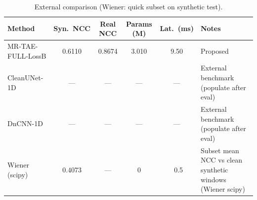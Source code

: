 \begin{table}[t]
\centering
\caption{External comparison (Wiener: quick subset on synthetic test).}
\label{tab:comparison}
\begin{tabular}{lccccl}
\hline
Method & Syn.\ NCC & Real NCC & Params (M) & Lat.\ (ms) & Notes \\
\hline
MR-TAE-FULL-LossB & 0.6110 & 0.8674 & 3.010 & 9.50 & Proposed \\
CleanUNet-1D & --- & --- & --- & --- & External benchmark (populate after eval) \\
DnCNN-1D & --- & --- & --- & --- & External benchmark (populate after eval) \\
Wiener (scipy) & 0.4073 & --- & 0 & ~0.5 & Subset mean NCC vs clean synthetic windows (Wiener scipy) \\
\hline
\end{tabular}
\end{table}

